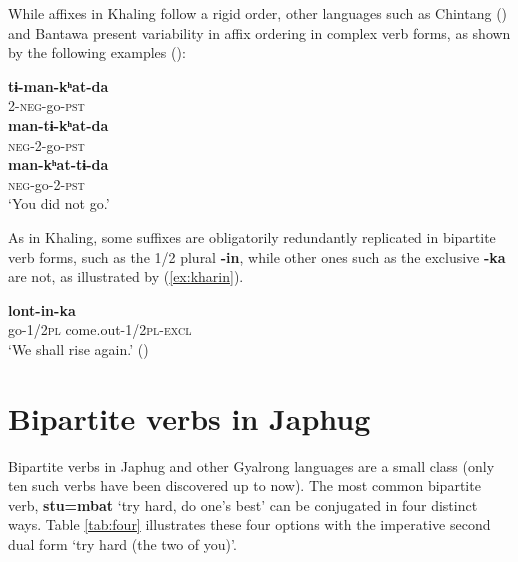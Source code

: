 \documentclass[oldfontcommands,oneside,a4paper,11pt]{article}
\newcommand{\ipa}[1]{{\phon\textbf{#1}}}
\newcommand{\jpg}[2]{\ipa{#1} `#2'}
\newcommand{\refb}[1]{(\ref{#1})}
\begin{document}
While affixes in Khaling follow a rigid order, other languages such as Chintang (\citealt{bickel07chintang}) and Bantawa present variability in affix ordering in complex verb forms, as shown by the following examples (\citealt[170-172]{doornenbal09}):

\begin{exe}
\ex 
\gll 
\ipa{tɨ-man-kʰat-da} \\
2-\textsc{neg}-go-\textsc{pst} \\
\ex
\gll 
\ipa{man-tɨ-kʰat-da} \\
\textsc{neg}-2-go-\textsc{pst} \\
\ex 
\gll 
\ipa{man-kʰat-tɨ-da} \\
\textsc{neg}-go-2-\textsc{pst} \\
\glt `You did not go.'
\end{exe}

As in Khaling, some suffixes are obligatorily redundantly replicated in bipartite verb forms, such as the 1/2 plural \ipa{-in}, while other ones such as the exclusive \ipa{-ka} are not, as illustrated by \refb{ex:kharin}.

 \begin{exe}
\ex  \label{ex:kharin}
\gll \ipa{kʰar-in} \ipa{lont-in-ka} \\
go-\textsc{1/2pl} come.out-\textsc{1/2pl-excl} \\
\glt `We shall rise again.' (\citealt[254]{doornenbal09})
\end{exe}



\section{Bipartite verbs in Japhug} \label{sec:japhug.bipart}

Bipartite verbs in Japhug and other Gyalrong languages are a small class (only ten such verbs have been discovered up to now). 
The most common bipartite verb, \jpg{stu=mbat}{try hard, do one's best} can be conjugated in four distinct ways. Table \ref{tab:four} illustrates these four options with the imperative second dual form `try hard (the two of you)'.
\end{document}
